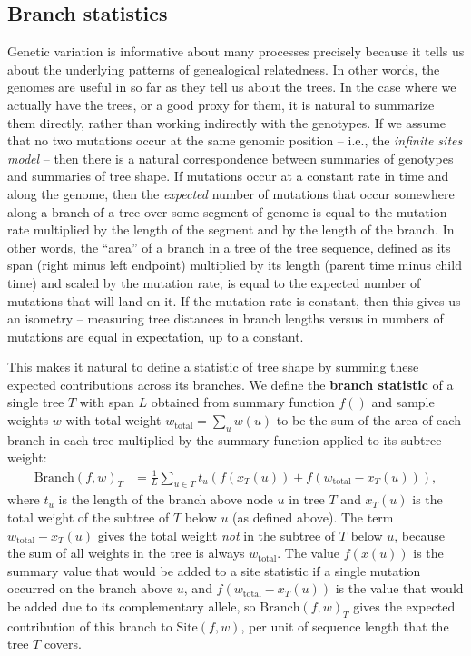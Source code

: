 \documentclass{article}
\newcommand{\branch}{\mbox{Branch}} %
\newcommand{\site}{\mbox{Site}} %
\newcommand{\iw}{w} %
\newcommand{\tiw}{w_\text{total}} %
\newcommand{\nw}{x} %
\begin{document}
\subsection*{Branch statistics}

Genetic variation is informative about many processes
precisely because it tells us about the underlying patterns of genealogical relatedness.
In other words, the genomes are useful in so far as they tell us about the trees.
In the case where we actually have the trees, or a good proxy for them,
it is natural to summarize them directly, rather than working indirectly with the genotypes.
If we assume that no two mutations occur at the same genomic position --
i.e., the \emph{infinite sites model} --
then there is a natural correspondence between summaries of genotypes and summaries of tree shape.
If mutations occur at a constant rate in time and along the genome,
then the \emph{expected} number of mutations that occur somewhere along a branch of a tree
over some segment of genome
is equal to the mutation rate multiplied by the length of the segment and by the length of the branch.
In other words, the ``area'' of a branch in a tree of the tree sequence,
defined as its span (right minus left endpoint) multiplied by its length (parent time minus child time)
and scaled by the mutation rate,
is equal to the expected number of mutations that will land on it.
If the mutation rate is constant,
then this gives us an isometry --
measuring tree distances in branch lengths versus in numbers of mutations
are equal in expectation, up to a constant.

This makes it natural to define
a statistic of tree shape by summing these expected contributions across its branches.
We define the \textbf{branch statistic} of a single tree $T$ with span $L$
obtained from summary function $f()$
and sample weights $\iw$ with total weight $\tiw = \sum_u \iw(u)$
to be the sum of the area of each branch in each tree
multiplied by the summary function applied to its subtree weight:
\begin{align}
    \branch(f, \iw)_T
    &=
    \frac{1}{L} \sum_{u \in T} t_{u} \left( f(\nw_{T}(u)) + f(\tiw - \nw_{T}(u)) \right)  ,
\end{align}
where $t_{u}$ is the length of the branch above node $u$ in tree $T$
and $\nw_{T}(u)$ is the total weight of the subtree of $T$ below $u$ (as defined above).
The term $\tiw - \nw_{T}(u)$ gives the total weight \emph{not} in the subtree of $T$ below $u$,
because the sum of all weights in the tree is always $\tiw$.
The value $f(\nw(u))$ is the summary value that would be added to a site statistic
if a single mutation occurred on the branch above $u$,
and $f(\tiw - \nw_{T}(u))$ is the value that would be added due to its complementary allele,
so $\branch(f, \iw)_T$ gives the expected contribution of this branch to $\site(f, \iw)$,
per unit of sequence length that the tree $T$ covers.
\end{document}
